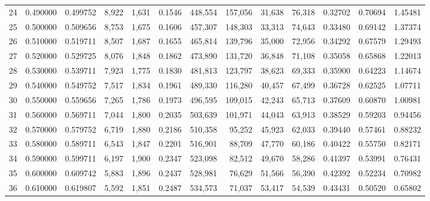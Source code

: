 \begin{tabular}{rrrrrrrrrrrrr}
24 &  0.490000 &  0.499752 &   8,922 &  1,631 &                                     0.1546 &  448,554 &  157,056 &   31,638 &   76,318 &  0.32702 &  0.70694 &  1.45481 \\
25 &  0.500000 &  0.509656 &   8,753 &  1,675 &                                     0.1606 &  457,307 &  148,303 &   33,313 &   74,643 &  0.33480 &  0.69142 &  1.37374 \\
26 &  0.510000 &  0.519711 &   8,507 &  1,687 &                                     0.1655 &  465,814 &  139,796 &   35,000 &   72,956 &  0.34292 &  0.67579 &  1.29493 \\
27 &  0.520000 &  0.529725 &   8,076 &  1,848 &                                     0.1862 &  473,890 &  131,720 &   36,848 &   71,108 &  0.35058 &  0.65868 &  1.22013 \\
28 &  0.530000 &  0.539711 &   7,923 &  1,775 &                                     0.1830 &  481,813 &  123,797 &   38,623 &   69,333 &  0.35900 &  0.64223 &  1.14674 \\
29 &  0.540000 &  0.549752 &   7,517 &  1,834 &                                     0.1961 &  489,330 &  116,280 &   40,457 &   67,499 &  0.36728 &  0.62525 &  1.07711 \\
30 &  0.550000 &  0.559656 &   7,265 &  1,786 &                                     0.1973 &  496,595 &  109,015 &   42,243 &   65,713 &  0.37609 &  0.60870 &  1.00981 \\
31 &  0.560000 &  0.569711 &   7,044 &  1,800 &                                     0.2035 &  503,639 &  101,971 &   44,043 &   63,913 &  0.38529 &  0.59203 &  0.94456 \\
32 &  0.570000 &  0.579752 &   6,719 &  1,880 &                                     0.2186 &  510,358 &   95,252 &   45,923 &   62,033 &  0.39440 &  0.57461 &  0.88232 \\
33 &  0.580000 &  0.589711 &   6,543 &  1,847 &                                     0.2201 &  516,901 &   88,709 &   47,770 &   60,186 &  0.40422 &  0.55750 &  0.82171 \\
34 &  0.590000 &  0.599711 &   6,197 &  1,900 &                                     0.2347 &  523,098 &   82,512 &   49,670 &   58,286 &  0.41397 &  0.53991 &  0.76431 \\
35 &  0.600000 &  0.609742 &   5,883 &  1,896 &                                     0.2437 &  528,981 &   76,629 &   51,566 &   56,390 &  0.42392 &  0.52234 &  0.70982 \\
36 &  0.610000 &  0.619807 &   5,592 &  1,851 &                                     0.2487 &  534,573 &   71,037 &   53,417 &   54,539 &  0.43431 &  0.50520 &  0.65802 \\

\end{tabular}
